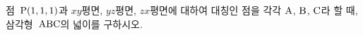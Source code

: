 점~$\mathrm{P}(1{,}\mkern3mu\mathopen{}1{,}\mkern3mu\mathopen{}1)$과 $xy$평면, $yz$평면, $zx$평면에 대하여 대칭인 점을 각각 $\mathrm{A}$, $\mathrm{B}$, $\mathrm{C}$라 할 때, 삼각형~$\mathrm{ABC}$의 넓이를 구하시오.
